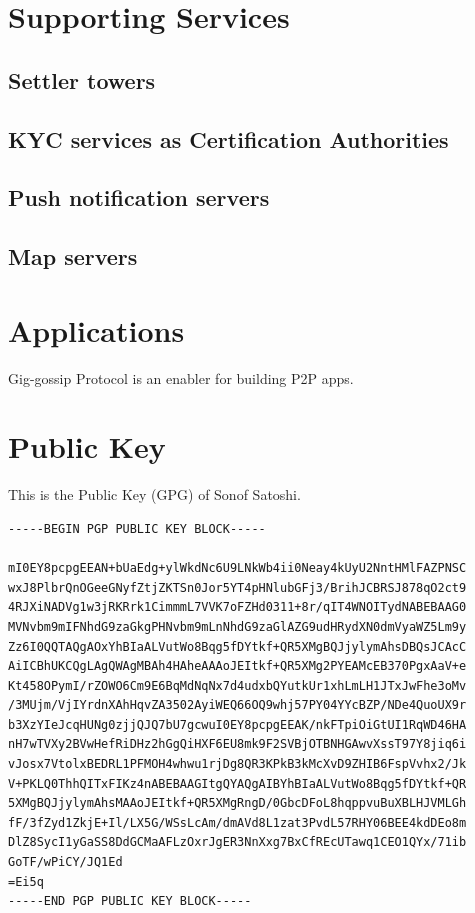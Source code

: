 \documentclass{article}
\begin{document}
\section{Supporting Services}

\subsection{Settler towers}

\subsection{KYC services as Certification Authorities}

\subsection{Push notification servers}

\subsection{Map servers}

\section{Applications}

Gig-gossip Protocol is an enabler for building P2P apps.


\section{Public Key}
This is the Public Key (GPG) of Sonof Satoshi.
\label{gpgkey}
\begin{small}
\begin{verbatim}
-----BEGIN PGP PUBLIC KEY BLOCK-----

mI0EY8pcpgEEAN+bUaEdg+ylWkdNc6U9LNkWb4ii0Neay4kUyU2NntHMlFAZPNSC
wxJ8PlbrQnOGeeGNyfZtjZKTSn0Jor5YT4pHNlubGFj3/BrihJCBRSJ878qO2ct9
4RJXiNADVg1w3jRKRrk1CimmmL7VVK7oFZHd0311+8r/qIT4WNOITydNABEBAAG0
MVNvbm9mIFNhdG9zaGkgPHNvbm9mLnNhdG9zaGlAZG9udHRydXN0dmVyaWZ5Lm9y
Zz6I0QQTAQgAOxYhBIaALVutWo8Bqg5fDYtkf+QR5XMgBQJjylymAhsDBQsJCAcC
AiICBhUKCQgLAgQWAgMBAh4HAheAAAoJEItkf+QR5XMg2PYEAMcEB370PgxAaV+e
Kt458OPymI/rZOWO6Cm9E6BqMdNqNx7d4udxbQYutkUr1xhLmLH1JTxJwFhe3oMv
/3MUjm/VjIYrdnXAhHqvZA3502AyiWEQ66OQ9whj57PY04YYcBZP/NDe4QuoUX9r
b3XzYIeJcqHUNg0zjjQJQ7bU7gcwuI0EY8pcpgEEAK/nkFTpiOiGtUI1RqWD46HA
nH7wTVXy2BVwHefRiDHz2hGgQiHXF6EU8mk9F2SVBjOTBNHGAwvXssT97Y8jiq6i
vJosx7VtolxBEDRL1PFMOH4whwu1rjDg8QR3KPkB3kMcXvD9ZHIB6FspVvhx2/Jk
V+PKLQ0ThhQITxFIKz4nABEBAAGItgQYAQgAIBYhBIaALVutWo8Bqg5fDYtkf+QR
5XMgBQJjylymAhsMAAoJEItkf+QR5XMgRngD/0GbcDFoL8hqppvuBuXBLHJVMLGh
fF/3fZyd1ZkjE+Il/LX5G/WSsLcAm/dmAVd8L1zat3PvdL57RHY06BEE4kdDEo8m
DlZ8SycI1yGaSS8DdGCMaAFLzOxrJgER3NnXxg7BxCfREcUTawq1CEO1QYx/71ib
GoTF/wPiCY/JQ1Ed
=Ei5q
-----END PGP PUBLIC KEY BLOCK-----
\end{verbatim}
\end{small}



  
\end{document}
